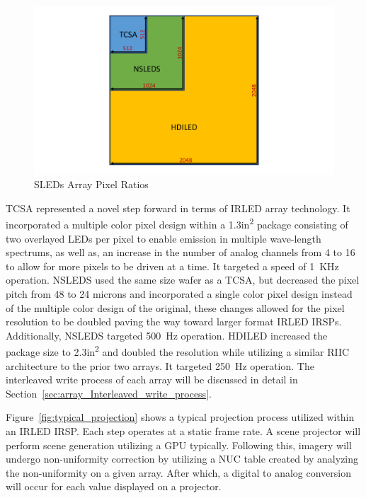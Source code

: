     \begin{figure}
        \centering
        \includegraphics[trim=0.5in 0.5in 0.5in 1.5in,width=1.0\textwidth]{fig/tcsa_nsleds_hdiled_array_ratio.pdf}
        \caption{SLEDs Array Pixel Ratios}
        \label{fig:tcsa_nsleds_hdiled_array_ratio}
    \end{figure}

    TCSA represented a novel step forward in terms of IRLED array technology. It incorporated a multiple color pixel design within a 1.3in\textsuperscript{2} package consisting of two overlayed LEDs per pixel to enable emission in multiple wave-length spectrums, as well as, an increase in the number of analog channels from 4 to 16 to allow for more pixels to be driven at a time. It targeted a speed of \mbox{1 KHz} operation. NSLEDS used the same size wafer as a TCSA, but decreased the pixel pitch from 48 to 24 microns and incorporated a single color pixel design instead of the multiple color design of the original, these changes allowed for the pixel resolution to be doubled paving the way toward larger format IRLED IRSPs. Additionally, NSLEDS targeted \mbox{500 Hz} operation. HDILED increased the package size to 2.3in\textsuperscript{2} and doubled the resolution while utilizing a similar RIIC architecture to the prior two arrays. It targeted \mbox{250 Hz} operation. The interleaved write process of each array will be discussed in detail in Section~\ref{sec:array_Interleaved_write_process}.

    Figure~\ref{fig:typical_projection} shows a typical projection process utilized within an IRLED IRSP. Each step operates at a static frame rate. A scene projector will perform scene generation utilizing a GPU typically. Following this, imagery will undergo non-uniformity correction by utilizing a NUC table created by analyzing the non-uniformity on a given array. After which, a digital to analog conversion will occur for each value displayed on a projector.

